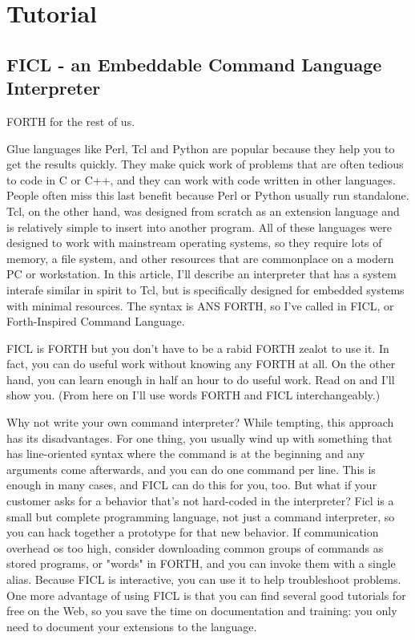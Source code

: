 \chapter{Tutorial}
\section{FICL - an Embeddable Command Language Interpreter}
FORTH for the rest of us.

Glue languages like Perl, Tcl and Python are popular because they
help you to get the results quickly. They make quick work of
problems that are often tedious to code in C or C++, and they can
work with code written in other languages. People often miss
this last benefit because Perl or Python usually run standalone.
Tcl, on the other hand, was designed from scratch as an extension
language and is relatively simple to insert into another program.
All of these languages were designed to work with mainstream
operating systems, so they require lots of memory, a file system,
and other resources that are commonplace on a modern PC or
workstation. In this article, I'll describe an interpreter that has
a system interafe similar in spirit to Tcl, but is specifically
designed for embedded systems with minimal resources. The syntax is
ANS FORTH, so I've called in FICL, or Forth-Inspired Command Language.

FICL is FORTH but you don't have to be a rabid FORTH zealot to use it.
In fact, you can do useful work without knowing any FORTH at all.
On the other hand, you can learn enough in half an hour to do useful
work. Read on and I'll show you. (From here on I'll use words FORTH
and FICL interchangeably.)

Why not write your own command interpreter? While tempting, this
approach has its disadvantages. For one thing, you usually wind up
with something that has line-oriented syntax where the command is at
the beginning and any arguments come afterwards, and you can do
one command per line. This is enough in many cases, and FICL can
do this for you, too. But what if your customer asks for a behavior
that's not hard-coded in the interpreter? Ficl is a small but
complete programming language, not just a command interpreter, so
you can hack together a prototype for that new behavior. If
communication overhead os too high, consider downloading common
groups of commands as stored programs, or "words" in FORTH, and you
can invoke them with a single alias. Because FICL is interactive,
you can use it to help troubleshoot problems. One more advantage of
using FICL is that you can find several good tutorials for free
on the Web, so you save the time on documentation and training:
you only need to document your extensions to the language.

